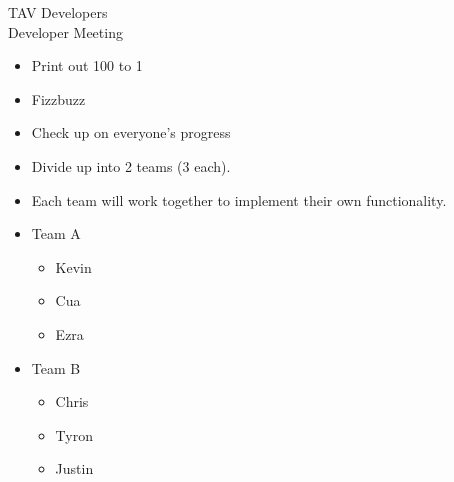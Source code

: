 \documentclass{article}
\begin{document}
\begin{Minutes}{TAV Developers\\Developer Meeting}




\starttime{}
\endtime{}


\maketitle

\begin{itemize}
	\item Print out 100 to 1
	\item Fizzbuzz
\end{itemize}

\begin{itemize}
	\item Check up on everyone's progress
\end{itemize}

\begin{itemize}
	\item Divide up into 2 teams (3 each).
	\item Each team will work together to implement their own functionality.
	\item Team A
	\begin{itemize}
		\item Kevin
		\item Cua
		\item Ezra
	\end{itemize}
	\item Team B
	\begin{itemize}
		\item Chris
		\item Tyron
		\item Justin
	\end{itemize}
\end{itemize}


\end{Minutes}
\end{document}
